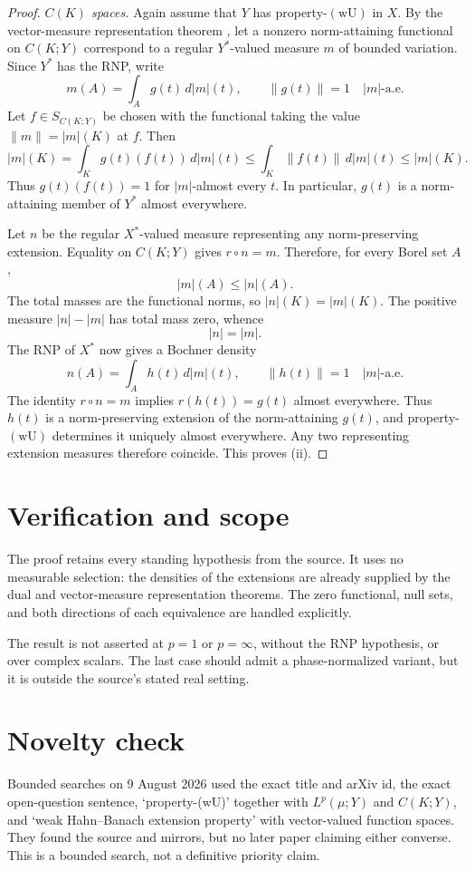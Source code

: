\documentclass[11pt]{article}
\newcommand{\wU}{\mathrm{(wU)}}
\newcommand{\dd}{\,d}
\begin{document}
\begin{proof}
\medskip
\noindent\emph{$C(K)$ spaces.}
Again assume that $Y$ has property-$\wU$ in $X$. By the vector-measure
representation theorem \cite{DU}, let a nonzero norm-attaining functional on
$C(K;Y)$ correspond to a regular $Y^*$-valued measure $m$ of bounded variation.
Since $Y^*$ has the RNP, write
\[
m(A)=\int_A g(t)\dd|m|(t),\qquad \|g(t)\|=1\quad |m|\text{-a.e.}
\]
Let $f\in S_{C(K;Y)}$ be chosen with the functional taking the value
$\|m\|=|m|(K)$ at $f$. Then
\[
|m|(K)=\int_K g(t)(f(t))\dd|m|(t)
\leq\int_K\|f(t)\|\dd|m|(t)\leq|m|(K).
\]
Thus $g(t)(f(t))=1$ for $|m|$-almost every $t$. In particular, $g(t)$ is a
norm-attaining member of $Y^*$ almost everywhere.

Let $n$ be the regular $X^*$-valued measure representing any norm-preserving
extension. Equality on $C(K;Y)$ gives $r\circ n=m$. Therefore, for every Borel
set $A$,
\[
|m|(A)\leq |n|(A).
\]
The total masses are the functional norms, so
$|n|(K)=|m|(K)$. The positive measure $|n|-|m|$ has total mass zero, whence
\[
|n|=|m|.
\]
The RNP of $X^*$ now gives a Bochner density
\[
n(A)=\int_A h(t)\dd|m|(t),\qquad \|h(t)\|=1\quad |m|\text{-a.e.}
\]
The identity $r\circ n=m$ implies $r(h(t))=g(t)$ almost everywhere. Thus
$h(t)$ is a norm-preserving extension of the norm-attaining $g(t)$, and
property-$\wU$ determines it uniquely almost everywhere. Any two representing
extension measures therefore coincide. This proves (ii).
\end{proof}

\section*{Verification and scope}

The proof retains every standing hypothesis from the source. It uses no
measurable selection: the densities of the extensions are already supplied by
the dual and vector-measure representation theorems. The zero functional,
null sets, and both directions of each equivalence are handled explicitly.

The result is not asserted at $p=1$ or $p=\infty$, without the RNP hypothesis,
or over complex scalars. The last case should admit a phase-normalized variant,
but it is outside the source's stated real setting.

\section*{Novelty check}

Bounded searches on 9 August 2026 used the exact title and arXiv id, the exact
open-question sentence, `property-(wU)' together with $L^p(\mu;Y)$ and
$C(K;Y)$, and `weak Hahn--Banach extension property' with vector-valued
function spaces. They found the source and mirrors, but no later paper claiming
either converse. This is a bounded search, not a definitive priority claim.
\end{document}
